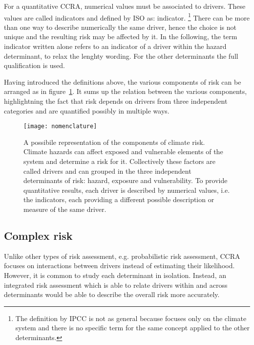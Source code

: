 For a quantitative \gls{CCRA}, numerical values must be associated to \glspl{driver}. These values are called \glspl{indicator} and defined by \gls{ISO} as: \glsdesc{indicator}.%
\footnote{The definition by \gls{IPCC} is not as general because focuses only on the climate system and there is no specific term for the same concept applied to the other \glspl{determinant}.}
There can be more than one way to describe numerically the same \gls{driver}, hence the choice is not unique and the resulting risk may be affected by it.
In the following, the term \gls{indicator} written alone refers to an \gls{indicator} of a \gls{driver} within the \gls{hazard} \gls{determinant}, to relax the lenghty wording. For the other \glspl{determinant} the full qualification is used.

Having introduced the definitions above, the various components of \gls{risk} can be arranged as in figure~\ref{fig:nomenclature}. It sums up the relation between the various components, highlightning the fact that risk depends on drivers from three independent categories and are quantified possibly in multiple ways.
\begin{figure}[h]
  \centering
  \texttt{[image: nomenclature]}
  \caption{A possibile representation of the components of climate risk. Climate hazards can affect exposed and vulnerable elements of the system and determine a risk for it. Collectively these factors are called drivers and can grouped in the three independent determinants of risk: hazard, exposure and vulnerability. To provide quantitative results, each driver is described by numerical values, i.e. the indicators, each providing a different possible description or measure of the same driver.}
  \label{fig:nomenclature}
\end{figure}



\subsection{Complex risk}
\label{sec:Complex risk}
Unlike other types of risk assessment, e.g. probabilistic risk assessment, \gls{CCRA} focuses on interactions between \glspl{driver} instead of estimating their likelihood.\cite[20-21]{2017GIZRiskSupplement} However, it is common to study each \gls{determinant} in isolation. Instead, an integrated risk assessment which is able to relate \glspl{driver} within and across \glspl{determinant} would be able to describe the overall \gls{risk} more accurately.\cite[145-147]{2022BegumPointOf}

